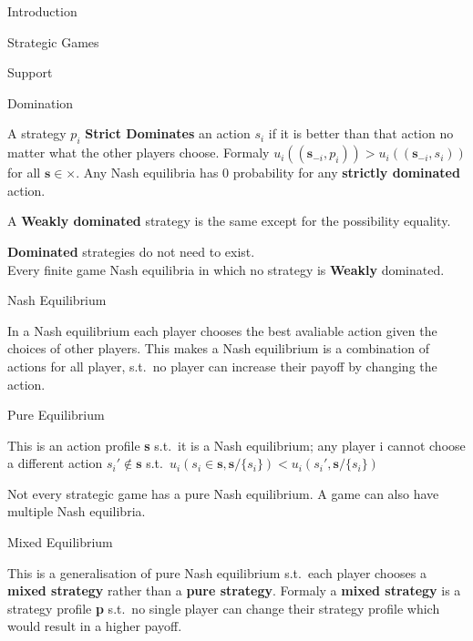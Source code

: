 \documentclass[12pt, letterpaper]{article}
\begin{document}
\begin{section}{Introduction}
\begin{subsection}{Strategic Games}
\begin{subsubsection}{Support}
    \end{subsubsection}

    \begin{subsubsection}{Domination}

      A strategy \(p_{i}\) \textbf{Strict Dominates} an action \(s_{i}\) if it
      is better than that action no matter what the other players choose.
      Formaly \(u_{i}((\textbf{s}_{-i}, p_{i})) >
      u_{i}((\textbf{s}_{-i}, s_{i}))\) for all \(\textbf{s} \in \times\).
      Any Nash equilibria has 0 probability for any \textbf{strictly dominated}
      action.

      A \textbf{Weakly dominated} strategy is the same except for the
      possibility equality.

      \textbf{Dominated} strategies do not need to exist. \\ Every finite game
      Nash equilibria in which no strategy is \textbf{Weakly} dominated.

    \end{subsubsection}

  \end{subsection}

  \begin{subsection}{Nash Equilibrium}

    In a Nash equilibrium each player chooses the best avaliable action given
    the choices of other players. This makes a Nash equilibrium is a
    combination of actions for all player, s.t.\ no player can increase their
    payoff by changing the action.

    \begin{subsubsection}{Pure Equilibrium}

      This is an action profile \textbf{s} s.t.\ it is a Nash equilibrium; any
      player i cannot choose a different action \(s_{i}' \notin \textbf{s}\)
      s.t.\ \(u_{i}(s_{i} \in \textbf{s}, \textbf{s} / \{s_{i}\}) <
      u_{i}(s_{i}', \textbf{s} / \{s_{i}\})\)

      Not every strategic game has a pure Nash equilibrium. A game can also
      have multiple Nash equilibria.

    \end{subsubsection}

    \begin{subsubsection}{Mixed Equilibrium}

      This is a generalisation of pure Nash equilibrium s.t.\ each player
      chooses a \textbf{mixed strategy} rather than a \textbf{pure strategy}.
      Formaly a \textbf{mixed strategy} is a strategy profile \textbf{p} s.t.\
      no single player can change their strategy profile which would result in
      a higher payoff.


\end{subsubsection}
\end{subsection}
\end{section}
\end{document}
